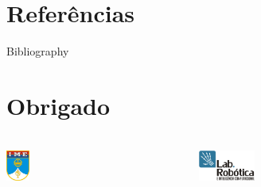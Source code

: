\documentclass{beamer}
\begin{document}
\section*{Referências}


\begin{frame}[allowframebreaks]{Bibliography}
	\frametitle{\insertsection}
	
	\footnotesize
\end{frame}




\section*{Obrigado}
\begin{frame}[b]
	\frametitle{}
	
	
	\vspace{2cm}
	\hfill
	\begin{columns}[T]
		\begin{column}[T]{3cm}	
	
			\includegraphics[height=1.0cm,keepaspectratio]{img/ime.jpg}\centering
		\end{column}
		\begin{column}[T]{3cm}
	
			\includegraphics[height=1.0cm,keepaspectratio]{img/lab-logo.png}\centering
	
		\end{column}
	\end{columns}
		
	

\end{frame}



\end{document}
